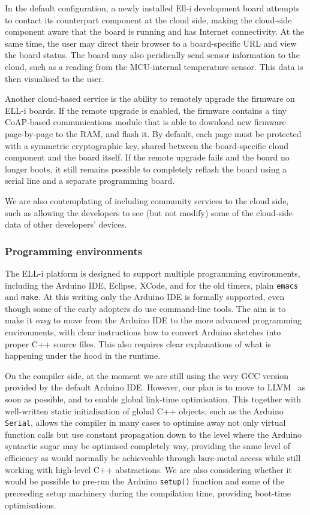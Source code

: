 \documentclass[draft,a4paper]{siamltex}
\begin{document}
In the default configuration, a newly installed Ell-i development
board attempts to contact its counterpart component at the cloud
side, making the cloud-side component aware that the board is running
and has Internet connectivity.  At the same time, the user may direct
their browser to a board-specific URL and view the board status.  The
board may also peridically send sensor information to the cloud, such
as a reading from the MCU-internal temperature sensor.  This data is
then visualised to the user.

Another cloud-based service is the ability to remotely upgrade the
firmware on ELL-i boards.  If the remote upgrade is enabled, the
firmware contains a tiny CoAP-based communications module that is able
to download new firmware page-by-page to the RAM, and flash it.  By
default, each page must be protected with a symmetric cryptographic
key, shared between the board-specific cloud component and the board
itself.  If the remote upgrade fails and the board no longer boots, it
still remains possible to completely reflash the board using a serial
line and a separate programming board.

We are also contemplating of including community services to the cloud
side, such as allowing the developers to see (but not modify) some of
the cloud-side data of other developers' devices.

\subsubsection{Programming environments}

The ELL-i platform is designed to support multiple programming
environments, including the Arduino IDE, Eclipse, XCode, and for the
old timers, plain \hbox{\tt emacs} and \hbox{\tt make}.  At this
writing only the Arduino IDE is formally supported, even though some
of the early adopters do use command-line tools.  The aim is to make
it {\it easy} to move from the Arduino IDE to the more advanced
programming environments, with clear instructions how to convert
Arduino sketches into proper C++ source files.  This also requires
clear explanations of what is happening under the hood in the runtime.

On the compiler side, at the moment we are still using the very GCC
version provided by the default Arduino IDE.  However, our plan is to
move to LLVM~\cite{LLVM} as soon as possible, and to enable global
link-time optimisation.  This together with well-written static
initialisation of global C++ objects, such as the Arduino \hbox{\tt
  Serial}, allows the compiler in many cases to optimise away not only
virtual function calls but use constant propagation down to the level
where the Arduino syntactic sugar may be optimised completely way,
providing the same level of efficiency as would normally be
achieveable through bare-metal access while still working with
high-level C++ abstractions.  We are also considering whether it would
be possible to pre-run the Arduino \hbox{\tt setup()} function and
some of the preceeding setup machinery during the compilation
time\cite{Rinta-aho_et_al}, providing boot-time optimisations.
\end{document}

